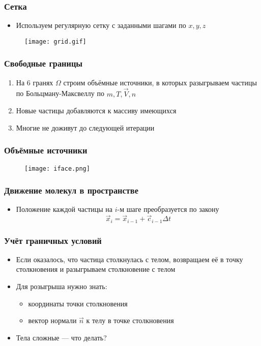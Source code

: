 \documentclass[onlymath]{beamer}
\begin{document}
\begin{frame}
  \frametitle{Сетка}
  \begin{itemize}
  \item Используем регулярную сетку с заданными шагами по $x, y, z$
  \end{itemize}
  \begin{figure}
    \centering
    \texttt{[image: grid.gif]}
  \end{figure}
\end{frame}

\begin{frame}
  \frametitle{Свободные границы}
  \begin{enumerate}
  \item На 6 гранях $\Omega$ строим объёмные источники, в которых
    разыгрываем частицы по Больцману-Максвеллу по $m, T, \vec{V}, n$
  \item Новые частицы добавляются к массиву имеющихся
  \item Многие не доживут до следующей итерации
  \end{enumerate}
\end{frame}

\begin{frame}
  \frametitle{Объёмные источники}
  \begin{figure}
    \centering
    \texttt{[image: iface.png]}
  \end{figure}
\end{frame}

\begin{frame}
  \frametitle{Движение молекул в пространстве}
  \begin{itemize}
  \item Положение каждой частицы на $i$-м шаге преобразуется по закону
    \begin{equation*}
      \vec{x}_i = \vec{x}_{i-1} + \vec{c}_{i-1} \Delta t
    \end{equation*}
  \end{itemize}
\end{frame}

\begin{frame}[fragile]
  \frametitle{Учёт граничных условий}
  \begin{itemize}
  \item Если оказалось, что частица столкнулась с телом, возвращаем её
    в точку столкновения и разыгрываем столкновение с телом
  \item Для розыгрыша нужно знать:
    \begin{itemize}
      \item координаты точки столкновения
      \item вектор нормали $\vec{n}$ к телу в точке столкновения
    \end{itemize}
  \item Тела сложные — что делать?
  \end{itemize}
\end{frame}
\end{document}
